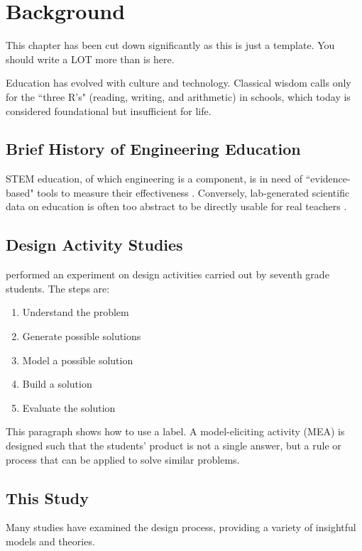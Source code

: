 \chapter{Background}
\label{chap:background}

This chapter has been cut down significantly as this is just a template. You should write a LOT more than is here.

Education has evolved with culture and technology.  Classical wisdom calls only for the ``three R's" (reading, writing, and arithmetic) in schools, which today is considered foundational but insufficient for life. 

\section{Brief History of Engineering Education}

STEM education, of which engineering is a component, is in need of ``evidence-based" tools to measure their effectiveness \citep{csed-guzdial}. Conversely, lab-generated scientific data on education is often too abstract to be directly usable for real teachers \citep{sandoval}.


\section{Design Activity Studies}
	\label{sec:activity-design-studies}
\citet{welch} performed an experiment on design activities
carried out by seventh grade students. The steps are:

\begin{enumerate}
\item Understand the problem
\item Generate possible solutions
\item Model a possible solution
\item Build a solution
\item Evaluate the solution
\end{enumerate}

This paragraph shows how to use a label. A model-eliciting activity (MEA) is \label{sec:MEA}
designed such that the students' product is not a single
answer, but a rule or process that can be applied to solve similar
problems.

\section{This Study}
Many studies have examined the design process, providing a variety of insightful models and theories. 
